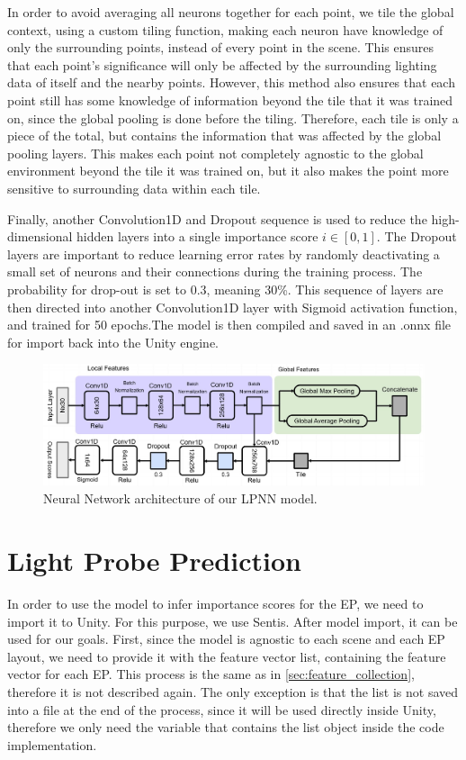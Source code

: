 In order to avoid averaging all neurons together for each point, we tile the global context, using a custom tiling function, making each neuron have knowledge of only the surrounding points, instead of every point in the scene. This ensures that each point's significance will only be affected by the surrounding lighting data of itself and the nearby points. However, this method also ensures that each point still has some knowledge of information beyond the tile that it was trained on, since the global pooling is done before the tiling. Therefore, each tile is only a piece of the total, but contains the information that was affected by the global pooling layers. This makes each point not completely agnostic to the global environment beyond the tile it was trained on, but it also makes the point more sensitive to surrounding data within each tile.

Finally, another Convolution1D and Dropout sequence is used to reduce the high-dimensional hidden layers into a single importance score $i \in [0,1]$. The Dropout layers are important to reduce learning error rates by randomly deactivating a small set of neurons and their connections during the training process. The probability for drop-out is set to 0.3, meaning 30\%. This sequence of layers are then directed into another Convolution1D layer with Sigmoid activation function, and trained for 50 epochs.The model is then compiled and saved in an .onnx file for import back into the Unity engine.

\begin{figure}[h]
	\centering
	\includegraphics[scale=0.392]{Graphics/LPNN.jpg}
	\caption{Neural Network architecture of our LPNN model.}
	\label{fig:LPNN_arch}
\end{figure}

\section{Light Probe Prediction}
\label{sec:lp_predict}
In order to use the model to infer importance scores for the EP, we need to import it to Unity. For this purpose, we use Sentis. After model import, it can be used for our goals. First, since the model is agnostic to each scene and each EP layout, we need to provide it with the feature vector list, containing the feature vector for each EP. This process is the same as in \ref{sec:feature_collection}, therefore it is not described again. The only exception is that the list is not saved into a file at the end of the process, since it will be used directly inside Unity, therefore we only need the variable that contains the list object inside the code implementation.


